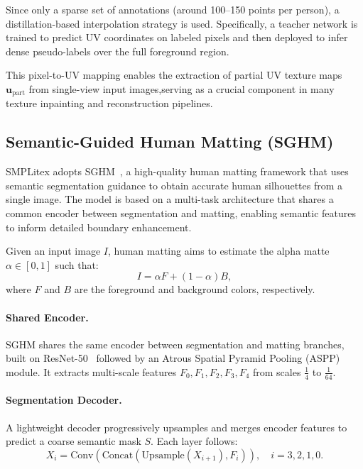 Since only a sparse set of annotations (around 100--150 points per person), a distillation-based interpolation strategy is used. Specifically, a teacher network is trained to predict UV coordinates on labeled pixels and then deployed to infer dense pseudo-labels over the full foreground region.

This pixel-to-UV mapping enables the extraction of partial UV texture maps $\mathbf{u}_{\text{part}}$ from single-view input images,serving as a crucial component in many texture inpainting and reconstruction pipelines.


\subsection{Semantic-Guided Human Matting (SGHM)}
\label{sec:sghm}

SMPLitex adopts SGHM~\cite{chen2022sghm}, a high-quality human matting framework that uses semantic segmentation guidance to obtain accurate human silhouettes from a single image. The model is based on a multi-task architecture that shares a common encoder between segmentation and matting, enabling semantic features to inform detailed boundary enhancement.

Given an input image $I$, human matting aims to estimate the alpha matte $\alpha \in [0, 1]$ such that:
\begin{equation}
I = \alpha F + (1 - \alpha) B,
\end{equation}
where $F$ and $B$ are the foreground and background colors, respectively.

\paragraph{Shared Encoder.} SGHM shares the same encoder between segmentation and matting branches, built on ResNet-50~\cite{he2015deepresiduallearningimage} followed by an  Atrous Spatial Pyramid Pooling (ASPP)~\cite{chen2017rethinkingatrousconvolutionsemantic} module. It extracts multi-scale features $F_0, F_1, F_2, F_3, F_4$ from scales $\tfrac{1}{4}$ to $\tfrac{1}{64}$.

\paragraph{Segmentation Decoder.} A lightweight decoder progressively upsamples and merges encoder features to predict a coarse semantic mask $S$. Each layer follows:
\begin{equation}
X_i = \text{Conv}(\text{Concat}(\text{Upsample}(X_{i+1}), F_i)), \quad i = 3, 2, 1, 0.
\end{equation}

